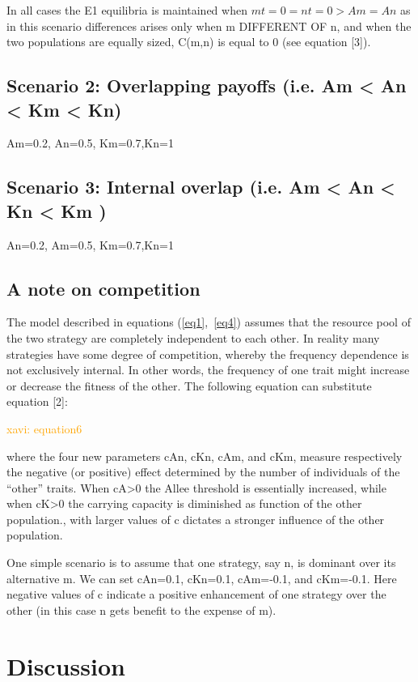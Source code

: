 \documentclass[preprint,authoryear]{elsarticle}
\newcommand{\memo}[2]{\textcolor{#1}{#2}}
\newcommand{\xavi}[1]{\memo{orange}{xavi: #1\\}}
\begin{document}
In all cases the E1 equilibria is maintained when $mt=0=nt=0 > Am=An$ as in this scenario differences arises only when m DIFFERENT OF n, and when the two populations are equally sized, C(m,n) is equal to 0 (see equation [3]).  

\subsection{Scenario 2: Overlapping payoffs (i.e.  Am <  An  < Km < Kn)}

Am=0.2, An=0.5, Km=0.7,Kn=1

\subsection{Scenario 3: Internal overlap  (i.e.  Am <  An < Kn <  Km )}

An=0.2, Am=0.5, Km=0.7,Kn=1

\subsection{A note on competition}

The model described in equations  (\ref{eq1},~\ref{eq4}) assumes that the resource pool of the two strategy are completely independent to each other. In reality many strategies have some degree of competition, whereby the frequency dependence is not exclusively internal. In other words, the frequency of one  trait might increase or decrease the fitness of the other. The following equation can substitute equation [2]: 

\xavi{equation6}

where the four new parameters cAn, cKn, cAm, and cKm, measure respectively the negative (or positive) effect determined by the number of individuals of the “other” traits. When cA>0 the Allee threshold is essentially increased, while when cK>0 the carrying capacity is diminished as function of the other population., with larger values of c dictates a stronger influence of the other population. 

One simple scenario is to assume that one strategy, say n, is dominant over its alternative m. We can  set cAn=0.1,  cKn=0.1,  cAm=-0.1, and  cKm=-0.1. Here negative values of c indicate a positive enhancement of one strategy over the other (in this case n gets benefit to the expense of m). 

\section{Discussion}
\end{document}
